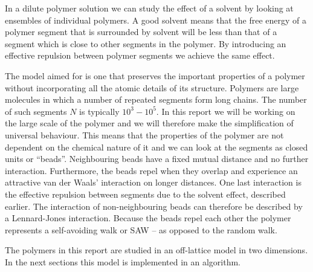 In a dilute polymer solution we can study the effect of a solvent by looking at ensembles of individual polymers. A good solvent means that the free energy of a polymer segment that is surrounded by solvent will be less than that of a segment which is close to other segments in the polymer. By introducing an effective repulsion between polymer segments we achieve the same effect.

The model aimed for is one that preserves the important properties of a polymer without incorporating all the atomic details of its structure. Polymers are large molecules in which a number of repeated segments form long chains. The number of such segments $N$ is typically $10^3 - 10^5$. In this report we will be working on the large scale of the polymer and we will therefore make the simplification of universal behaviour. This means that the properties of the polymer are not dependent on the chemical nature of it and we can look at the segments as closed units or ``beads''. Neighbouring beads have a fixed mutual distance and no further interaction. Furthermore, the beads repel when they overlap and experience an attractive van der Waals' interaction on longer distances. One last interaction is the effective repulsion between segments due to the solvent effect, described earlier. The interaction of non-neighbouring beads can therefore be described by a Lennard-Jones interaction. Because the beads repel each other the polymer represents a self-avoiding walk or SAW -- as opposed to the random walk.

The polymers in this report are studied in an off-lattice model in two dimensions. In the next sections this model is implemented in an algorithm.